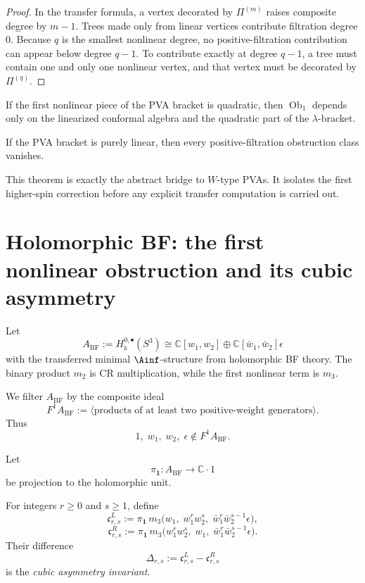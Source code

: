 \begin{proof}
In the transfer formula, a vertex decorated by $\Pi^{(m)}$ raises composite degree by $m-1$. Trees made only from linear vertices contribute filtration degree $0$. Because $q$ is the smallest nonlinear degree, no positive-filtration contribution can appear below degree $q-1$. To contribute exactly at degree $q-1$, a tree must contain one and only one nonlinear vertex, and that vertex must be decorated by $\Pi^{(q)}$.
\end{proof}

\begin{corollary}
If the first nonlinear piece of the PVA bracket is quadratic, then $\operatorname{Ob}_1$ depends only on the linearized conformal algebra and the quadratic part of the $\lambda$-bracket.
\end{corollary}

\begin{corollary}
If the PVA bracket is purely linear, then every positive-filtration obstruction class vanishes.
\end{corollary}

\begin{remark}
This theorem is exactly the abstract bridge to $W$-type PVAs. It isolates the first higher-spin correction before any explicit transfer computation is carried out.
\end{remark}

\section{Holomorphic BF: the first nonlinear obstruction and its cubic asymmetry}

Let
\[
A_{\mathrm{BF}}:=H_b^{0,\bullet}(S^3)\cong \mathbb{C}[w_1,w_2]\oplus \mathbb{C}[\bar w_1,\bar w_2]\epsilon
\]
with the transferred minimal $\Ainf$-structure from holomorphic BF theory. The binary product $m_2$ is CR multiplication, while the first nonlinear term is $m_3$.

We filter $A_{\mathrm{BF}}$ by the composite ideal
\[
F^1A_{\mathrm{BF}}:=\langle \text{products of at least two positive-weight generators}\rangle.
\]
Thus
\[
1,\; w_1,\; w_2,\; \epsilon \notin F^1A_{\mathrm{BF}}.
\]

Let
\[
\pi_{\mathbf 1}:A_{\mathrm{BF}}\to \mathbb{C}\cdot 1
\]
be projection to the holomorphic unit.

\begin{definition}
For integers $r\ge0$ and $s\ge1$, define
\[
\mathfrak c^L_{r,s}:=
\pi_{\mathbf 1}\,m_3\bigl(w_1,\;w_1^rw_2^s,\;\bar w_1^r\bar w_2^{s-1}\epsilon\bigr),
\]
\[
\mathfrak c^R_{r,s}:=
\pi_{\mathbf 1}\,m_3\bigl(w_1^rw_2^s,\;w_1,\;\bar w_1^r\bar w_2^{s-1}\epsilon\bigr).
\]
Their difference
\[
\Delta_{r,s}:=\mathfrak c^L_{r,s}-\mathfrak c^R_{r,s}
\]
is the \emph{cubic asymmetry invariant}.
\end{definition}

